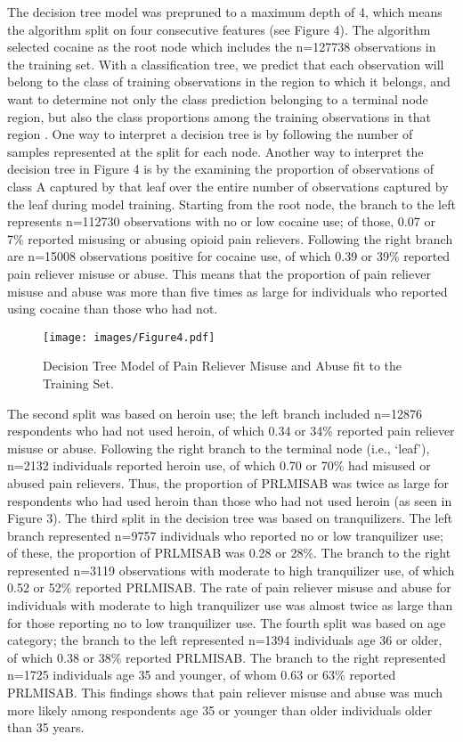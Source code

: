\documentclass[sigconf]{acmart}
\begin{document}
The decision tree model was prepruned to a maximum depth of 4, which means 
the algorithm split on four consecutive features (see Figure 4). The  
algorithm selected cocaine as the root node which includes the n=127738 
observations in the training set. With a classification tree, we predict 
that each observation will belong to the class of training observations in 
the region to which it belongs, and want to determine not only the class
prediction belonging to a terminal node region, but also the class 
proportions among the training observations in that region \cite{james13}. 
One way to interpret a decision tree is by following the number of samples 
represented at the split for each node. Another way to interpret the decision 
tree in Figure 4 is by the examining the proportion of observations of 
class A captured by that leaf over the entire number of observations captured 
by the leaf during model training. Starting from the root node, the branch 
to the left represents n=112730 observations with no or low cocaine use; 
of those, 0.07 or 7\% reported misusing or abusing opioid pain relievers. 
Following the right branch are n=15008 observations positive for cocaine use, 
of which 0.39 or 39\% reported pain reliever misuse or abuse. This means that 
the proportion of pain reliever misuse and abuse was more than five times as 
large for individuals who reported using cocaine than those who had not. 

\begin{figure}[!ht]
  \centering\texttt{[image: images/Figure4.pdf]}
  \caption{Decision Tree Model of Pain Reliever Misuse and Abuse
  fit to the Training Set.}
  \label{f:Figure4}
\end{figure}

The second split was based on heroin use; the left branch included n=12876 respondents who had not used heroin, of which 0.34 or 34\% reported pain
reliever misuse or abuse. Following the right branch to the terminal node 
(i.e., `leaf'), n=2132 individuals reported heroin use, of which 0.70 or 
70\% had misused or abused pain relievers. Thus, the proportion of PRLMISAB 
was twice as large for respondents who had used heroin than those who had 
not used heroin (as seen in Figure 3). The third split in the decision tree
was based on tranquilizers. The left branch represented n=9757 individuals 
who reported no or low tranquilizer use; of these, the proportion of 
PRLMISAB was 0.28 or 28\%. The branch to the right represented n=3119 
observations with moderate to high tranquilizer use, of which 0.52 or 52\% 
reported PRLMISAB. The rate of pain reliever misuse and abuse for individuals 
with moderate to high tranquilizer use was almost twice as large than for 
those reporting no to low tranquilizer use. The fourth split was based on age category; the branch to the left represented n=1394 individuals age 36 or older, 
of which 0.38 or 38\% reported PRLMISAB. The branch to the right represented 
n=1725 individuals age 35 and younger, of whom 0.63 or 63\% reported PRLMISAB. 
This findings shows that pain reliever misuse and abuse was much more likely
among respondents age 35 or younger than older individuals older than 35 years. 
\end{document}
